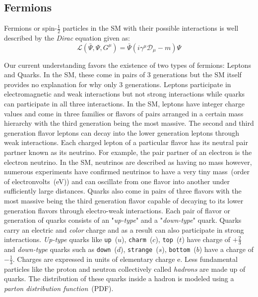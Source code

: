 \subsection*{Fermions}
Fermions or spin-$\frac{1}{2}$ particles in the SM with their possible interactions is well described by the \textit{Dirac} equation given as:
\begin{equation}
\mathcal{L}(\bar{\Psi},\Psi, G^{\mu}) = \bar{\Psi}\left(i \gamma^{\mu}\mathcal{D}_{\mu} - m \right)\Psi 
\end{equation}

Our current understanding favors the existence of two types of fermions: Leptons and Quarks. In the SM, these come in pairs of 3 generations but the SM itself provides no explanation for why only 3 generations.
Leptons participate in electromagnetic and weak interactions but not strong interactions while quarks can participate in all three interactions. In the SM, leptons have integer charge values and come in three families or flavors of pairs arranged in a certain mass hierarchy with the third generation being the most massive. The second and third generation flavor leptons can decay into the lower generation leptons through weak interactions. Each charged lepton of a particular flavor has its neutral pair partner known as its neutrino. For example, the pair partner of an electron is the electron neutrino. In the SM, neutrinos are described as having no mass however, numerous experiments have confirmed neutrinos to have a very tiny mass~(order of electronvolts~(eV)) and can oscillate from one flavor into another under sufficiently large distances.
\newline
Quarks also come in pairs of three flavors with the most massive being the third generation flavor capable of decaying to its lower generation flavors through electro-weak interactions. Each pair of flavor or generation of quarks consists of an "\textit{up-type}" and a "\textit{down-type}" quark. Quarks carry an electric and \textit{color} charge and as a result can also participate in strong interactions. \textit{Up-type} quarks like \texttt{up}~($u$), \texttt{charm}~($c$), \texttt{top}~($t$) have charge of $+\frac{2}{3}$ and \textit{down-type} quarks such as \texttt{down}~($d$), \texttt{strange}~($s$), \texttt{bottom}~($b$) have a charge of $-\frac{1}{3}$. Charges are expressed in units of elementary charge e.
Less fundamental particles like the proton  and neutron collectively called \textit{hadrons} are made up of quarks. The distribution of these quarks inside a hadron is modeled using a \textit{parton distribution function}~(PDF). 

